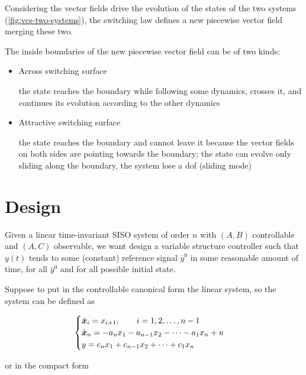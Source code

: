 Considering the vector fields drive the evolution of the states of the two systems (\cref{fig:vcs-two-systems}), the switching law defines a new piecewise vector field merging these two.

The inside boundaries of the new piecewise vector field can be of two kinds:

\begin{itemize}
    \item Across switching surface

    the state reaches the boundary while following some dynamics, crosses it, and continues its evolution according to the other dynamics

    \item Attractive switching surface

    the state reaches the boundary and cannot leave it because the vector fields on both sides are pointing towards the boundary;
    the state can evolve only sliding along the boundary, the system lose a dof (sliding mode)
\end{itemize}

\section{Design}

Given a linear time-invariant SISO system of order $n$ with $(A,B)$ controllable and $(A,C)$ observable, we want design a variable structure controller such that $y(t)$ tends to some (constant) reference signal $\bar y^0$ in some reasonable amount of time, for all $\bar y^0$ and for all possible initial state.

Suppose to put in the controllable canonical form the linear system, so the system can be defined as

\[
    \begin{cases}
        \dot{\boldsymbol{x}}_i = x_{i+1}, \qquad i = 1,2,\dots, n-1 \\
        \dot{\boldsymbol{x}}_n = - a_n x_1 - a_{n-1} x_2 - \dots - a_1 x_n + u \\
        y = c_n x_1 + c_{n-1} x_2 + \dots + c_1 x_n
    \end{cases}
\]

or in the compact form

